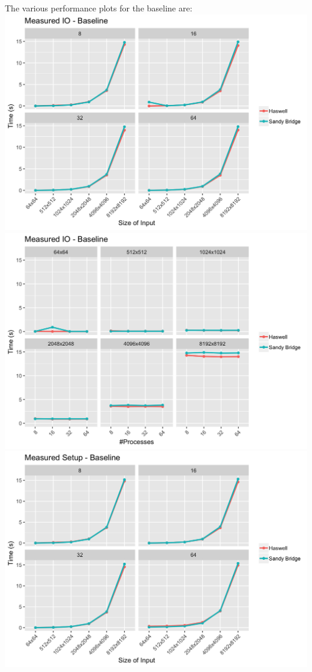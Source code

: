\documentclass[10pt, letterpaper, twoside]{article}
\begin{document}
\begin{titlepage}
\begin{enumerate}
The various performance plots for the baseline are: \\
\vspace{5mm}
\includegraphics[scale = 0.18]{Baseline_Measured-IO_Processes.png}
\includegraphics[scale = 0.18]{Baseline_Measured-IO_InputSize.png}
\vspace{5mm}
\includegraphics[scale = 0.18]{Baseline_Measured-Setup_Processes.png}

\end{enumerate}
\end{titlepage}
\end{document}
